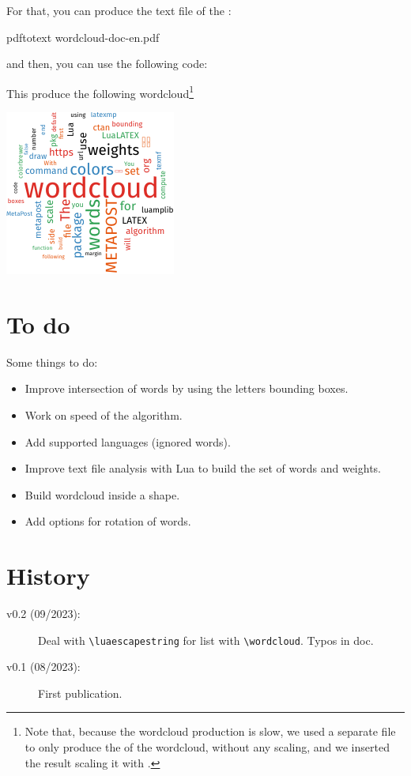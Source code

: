\documentclass[english]{ltxdoc}
\begin{document}
For that, you can produce the text file of the \pdf{}:
\begin{commandshell}
pdftotext wordcloud-doc-en.pdf
\end{commandshell}
and then, you can use the following code:
\begin{latexcode}
\end{latexcode}  

This produce the following wordcloud\footnote{Note that, because the wordcloud
production is slow, we used a separate file to only produce the \pdf{} of the
wordcloud, without any scaling, and we inserted the result scaling it with \cite{ctan-graphicx}.} 
\begin{center}
  \includegraphics[width=\linewidth]{doc-wc.pdf}
\end{center}

\section{To do}

Some things to do:
\begin{itemize}
  \item Improve intersection of words by using the letters bounding boxes.
  \item Work on speed of the algorithm.
  \item Add supported languages (ignored words).
  \item Improve text file analysis with Lua to build the set of words and
  weights.  
  \item Build wordcloud inside a shape.
  \item Add options for rotation of words.
\end{itemize}

\section{History}

\begin{description}
  \item[v0.2 (09/2023):] Deal with \lstinline+\luaescapestring+ for list with
  \lstinline+\wordcloud+. Typos in doc. 
  \item[v0.1 (08/2023):] First publication.
\end{description}
\printbibliography
\printindex
\newpage
\end{document}
